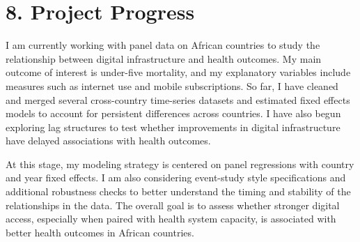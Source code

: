 \documentclass[12pt]{article}
\begin{document}
\section*{8. Project Progress}
I am currently working with panel data on African countries to study the relationship between digital infrastructure and health outcomes. My main outcome of interest is under-five mortality, and my explanatory variables include measures such as internet use and mobile subscriptions. So far, I have cleaned and merged several cross-country time-series datasets and estimated fixed effects models to account for persistent differences across countries. I have also begun exploring lag structures to test whether improvements in digital infrastructure have delayed associations with health outcomes.

At this stage, my modeling strategy is centered on panel regressions with country and year fixed effects. I am also considering event-study style specifications and additional robustness checks to better understand the timing and stability of the relationships in the data. The overall goal is to assess whether stronger digital access, especially when paired with health system capacity, is associated with better health outcomes in African countries.
\end{document}

